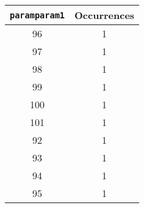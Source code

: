\begin{longtable}{|c|c|}
\hline
\textbf{\texttt{paramparam1}} & \textbf{Occurrences} \\
\hline
96 & 1 \\
\hline
97 & 1 \\
\hline
98 & 1 \\
\hline
99 & 1 \\
\hline
100 & 1 \\
\hline
101 & 1 \\
\hline
92 & 1 \\
\hline
93 & 1 \\
\hline
94 & 1 \\
\hline
95 & 1 \\
\hline
\end{longtable}